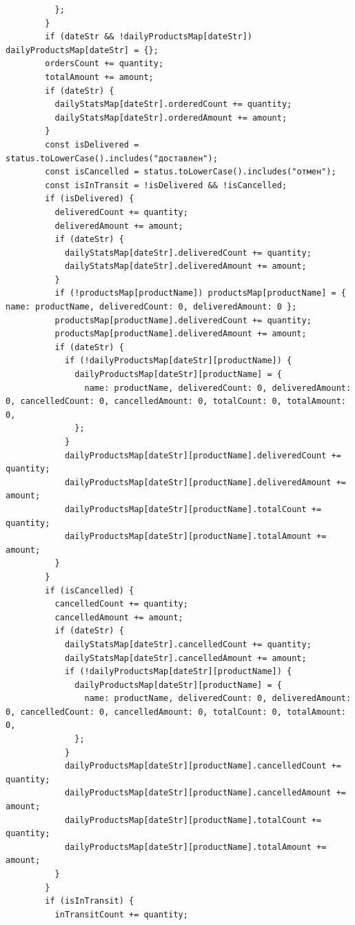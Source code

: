 \begin{code}
\begin{verbatim}
          };
        }
        if (dateStr && !dailyProductsMap[dateStr]) dailyProductsMap[dateStr] = {};
        ordersCount += quantity;
        totalAmount += amount;
        if (dateStr) {
          dailyStatsMap[dateStr].orderedCount += quantity;
          dailyStatsMap[dateStr].orderedAmount += amount;
        }
        const isDelivered = status.toLowerCase().includes("доставлен");
        const isCancelled = status.toLowerCase().includes("отмен");
        const isInTransit = !isDelivered && !isCancelled;
        if (isDelivered) {
          deliveredCount += quantity;
          deliveredAmount += amount;
          if (dateStr) {
            dailyStatsMap[dateStr].deliveredCount += quantity;
            dailyStatsMap[dateStr].deliveredAmount += amount;
          }
          if (!productsMap[productName]) productsMap[productName] = { name: productName, deliveredCount: 0, deliveredAmount: 0 };
          productsMap[productName].deliveredCount += quantity;
          productsMap[productName].deliveredAmount += amount;
          if (dateStr) {
            if (!dailyProductsMap[dateStr][productName]) {
              dailyProductsMap[dateStr][productName] = {
                name: productName, deliveredCount: 0, deliveredAmount: 0, cancelledCount: 0, cancelledAmount: 0, totalCount: 0, totalAmount: 0,
              };
            }
            dailyProductsMap[dateStr][productName].deliveredCount += quantity;
            dailyProductsMap[dateStr][productName].deliveredAmount += amount;
            dailyProductsMap[dateStr][productName].totalCount += quantity;
            dailyProductsMap[dateStr][productName].totalAmount += amount;
          }
        }
        if (isCancelled) {
          cancelledCount += quantity;
          cancelledAmount += amount;
          if (dateStr) {
            dailyStatsMap[dateStr].cancelledCount += quantity;
            dailyStatsMap[dateStr].cancelledAmount += amount;
            if (!dailyProductsMap[dateStr][productName]) {
              dailyProductsMap[dateStr][productName] = {
                name: productName, deliveredCount: 0, deliveredAmount: 0, cancelledCount: 0, cancelledAmount: 0, totalCount: 0, totalAmount: 0,
              };
            }
            dailyProductsMap[dateStr][productName].cancelledCount += quantity;
            dailyProductsMap[dateStr][productName].cancelledAmount += amount;
            dailyProductsMap[dateStr][productName].totalCount += quantity;
            dailyProductsMap[dateStr][productName].totalAmount += amount;
          }
        }
        if (isInTransit) {
          inTransitCount += quantity;

\end{verbatim}
\end{code}
